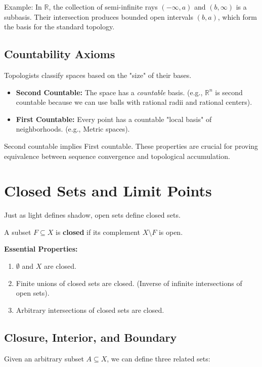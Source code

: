 Example: In $\mathbb{R}$, the collection of semi-infinite rays $(-\infty, a)$ and $(b, \infty)$ is a subbasis. Their intersection produces bounded open intervals $(b, a)$, which form the basis for the standard topology.

\subsection{Countability Axioms}
Topologists classify spaces based on the "size" of their bases.
\begin{itemize}
    \item \textbf{Second Countable:} The space has a \textit{countable} basis. (e.g., $\mathbb{R}^n$ is second countable because we can use balls with rational radii and rational centers).
    \item \textbf{First Countable:} Every point has a countable "local basis" of neighborhoods. (e.g., Metric spaces).
\end{itemize}
Second countable implies First countable. These properties are crucial for proving equivalence between sequence convergence and topological accumulation.

\section{Closed Sets and Limit Points}

Just as light defines shadow, open sets define closed sets.

\begin{definition}
A subset $F \subseteq X$ is \textbf{closed} if its complement $X \setminus F$ is open.
\end{definition}

\textbf{Essential Properties:}
\begin{enumerate}
    \item $\emptyset$ and $X$ are closed.
    \item Finite unions of closed sets are closed. (Inverse of infinite intersections of open sets).
    \item Arbitrary intersections of closed sets are closed.
\end{enumerate}

\newpage

\subsection{Closure, Interior, and Boundary}
Given an arbitrary subset $A \subseteq X$, we can define three related sets:

